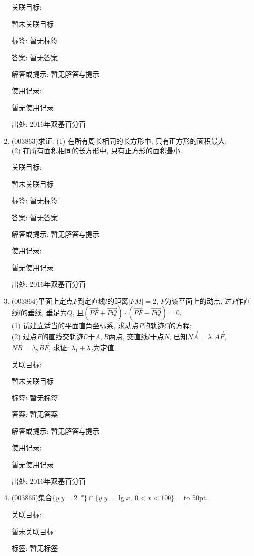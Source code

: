 \documentclass[10pt,a4paper]{article}
\newcommand{\blank}[1]{\underline{\hbox to #1pt{}}}
\begin{document}
\begin{enumerate}[1.]
关联目标:

暂未关联目标



标签: 暂无标签

答案: 暂无答案

解答或提示: 暂无解答与提示

使用记录:

暂无使用记录


出处: 2016年双基百分百
\item { (003863)}求证: (1) 在所有周长相同的长方形中, 只有正方形的面积最大;\\
(2) 在所有面积相同的长方形中, 只有正方形的面积最小.


关联目标:

暂未关联目标



标签: 暂无标签

答案: 暂无答案

解答或提示: 暂无解答与提示

使用记录:

暂无使用记录


出处: 2016年双基百分百
\item { (003864)}平面上定点$F$到定直线$l$的距离$|FM|=2$, $P$为该平面上的动点, 过$P$作直线$l$的垂线, 垂足为$Q$, 且$(\overrightarrow{PF}+\overrightarrow{PQ})\cdot (\overrightarrow{PF}-\overrightarrow{PQ})=0$.\\
(1) 试建立适当的平面直角坐标系, 求动点$P$的轨迹$C$的方程;\\
(2) 过点$F$的直线交轨迹$C$于$A,B$两点, 交直线$l$于点$N$, 已知$\overrightarrow{NA}=\lambda_1\overrightarrow{AF}$, $\overrightarrow{NB}=\lambda_2\overrightarrow{BF}$, 求证: $\lambda_1+\lambda_2$为定值.


关联目标:

暂未关联目标



标签: 暂无标签

答案: 暂无答案

解答或提示: 暂无解答与提示

使用记录:

暂无使用记录


出处: 2016年双基百分百
\item { (003865)}集合$\{y|y=2^{-x}\}\cap\{y|y=\lg x, \ 0<x<100\}=$\blank{50}.


关联目标:

暂未关联目标



标签: 暂无标签


\end{enumerate}
\end{document}
